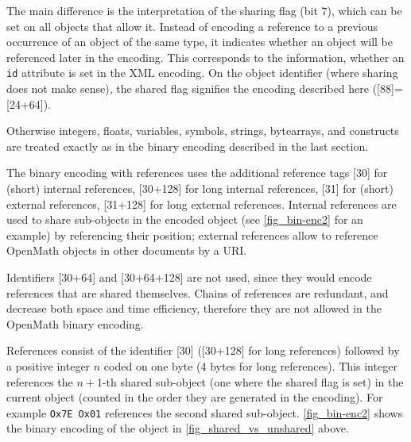 \documentclass{report}
\def\OM{OpenMath\xspace}
\def\XML{XML\xspace}
\begin{document}
    
  The main difference is the interpretation of the sharing flag (bit 7), which can be set
  on all objects that allow it. Instead of encoding a reference to a previous occurrence
  of an object of the same type, it indicates whether an object will be referenced later
  in the encoding. This corresponds to the information, whether an \lstinline|id|
  attribute is set in the \XML encoding. On the object identifier (where sharing does not
  make sense), the shared flag signifies the encoding described here ([88]=[24+64]).
        
  Otherwise integers, floats, variables, symbols, strings, bytearrays, and constructs are
  treated exactly as in the binary encoding described in the last section.

    
  The binary encoding with references uses the additional reference tags [30] for (short)
  internal references, [30+128] for long internal references, [31] for (short) external
  references, [31+128] for long external references. Internal references are used to share
  sub-objects in the encoded object (see \ref{fig_bin-enc2} for an example) by referencing
  their position; external references allow to reference \OM objects in other documents by
  a URI.

  Identifiers [30+64] and [30+64+128] are not used, since they would encode references
  that are shared themselves. Chains of references are redundant, and decrease both space
  and time efficiency, therefore they are not allowed in the \OM binary encoding.

    
  References consist of the identifier [30] ([30+128] for long references) followed by a
  positive integer $n$ coded on one byte (4 bytes for long references). This integer
  references the $n+1$-th shared sub-object (one where the shared flag is set) in the
  current object (counted in the order they are generated in the encoding). For example
  \lstinline|Ox7E Ox01| references the second shared sub-object. \ref{fig_bin-enc2} shows
  the binary encoding of the object in \ref{fig_shared_vs_unshared} above.
\end{document}
